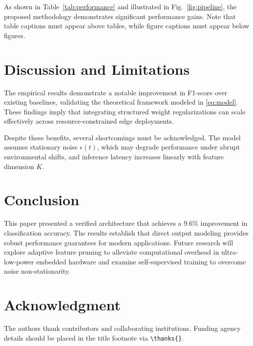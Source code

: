 \documentclass[conference]{IEEEtran}
\begin{document}
As shown in Table~\ref{tab:performance} and illustrated in Fig.~\ref{fig:pipeline}, the proposed methodology demonstrates significant performance gains. Note that table captions must appear above tables, while figure captions must appear below figures.

\section{Discussion and Limitations}
The empirical results demonstrate a notable improvement in F1-score over existing baselines, validating the theoretical framework modeled in \eqref{eq:model}. These findings imply that integrating structured weight regularizations can scale effectively across resource-constrained edge deployments. 

Despite these benefits, several shortcomings must be acknowledged. The model assumes stationary noise $\epsilon(t)$, which may degrade performance under abrupt environmental shifts, and inference latency increases linearly with feature dimension $K$.

\section{Conclusion}
This paper presented a verified architecture that achieves a 9.6\% improvement in classification accuracy. The results establish that direct output modeling provides robust performance guarantees for modern applications. Future research will explore adaptive feature pruning to alleviate computational overhead in ultra-low-power embedded hardware and examine self-supervised training to overcome noise non-stationarity.

\section*{Acknowledgment}
The authors thank contributors and collaborating institutions. Funding agency details should be placed in the title footnote via \verb|\thanks{}|.



\end{document}

